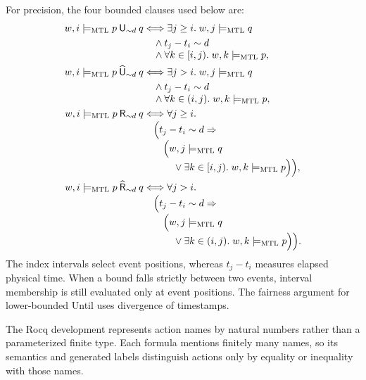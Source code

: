 \documentclass[manuscript]{acmart}
\newcommand{\satM}{\models_{\mathrm{MTL}}}
\newcommand{\Until}{\mathbin{\mathsf{U}}}
\newcommand{\Release}{\mathbin{\mathsf{R}}}
\newcommand{\hUntil}{\mathbin{\widehat{\mathsf{U}}}}
\newcommand{\hRelease}{\mathbin{\widehat{\mathsf{R}}}}
\begin{document}
For precision, the four bounded clauses used below are:
\begin{align*}
 w,i\satM p\Until_{\sim d}q
 &\Longleftrightarrow \exists j\ge i.\; w,j\satM q\\
 &\quad\land t_j-t_i\sim d\\[-1mm]
 &\quad\land \forall k\in[i,j).\;w,k\satM p,\\
 w,i\satM p\hUntil_{\sim d}q
 &\Longleftrightarrow \exists j>i.\; w,j\satM q\\
 &\quad\land t_j-t_i\sim d\\[-1mm]
 &\quad\land \forall k\in(i,j).\;w,k\satM p,\\
 w,i\satM p\Release_{\sim d}q
 &\Longleftrightarrow \forall j\ge i.\\[-1mm]
 &\quad\Bigl(t_j-t_i\sim d\Rightarrow\\[-1mm]
 &\qquad\Bigl(w,j\satM q\\[-1mm]
 &\qquad\quad\lor \exists k\in[i,j).\;w,k\satM p\Bigr)\Bigr),\\
 w,i\satM p\hRelease_{\sim d}q
 &\Longleftrightarrow \forall j>i.\\[-1mm]
 &\quad\Bigl(t_j-t_i\sim d\Rightarrow\\[-1mm]
 &\qquad\Bigl(w,j\satM q\\[-1mm]
 &\qquad\quad\lor \exists k\in(i,j).\;w,k\satM p\Bigr)\Bigr).
\end{align*}
The index intervals select event positions, whereas $t_j-t_i$ measures
elapsed physical time. When a bound falls strictly between two events, interval membership is still
evaluated only at event positions.
The fairness argument for lower-bounded Until uses divergence of timestamps.

The Rocq development represents action names by natural numbers rather than a
parameterized finite type. Each formula mentions finitely many names, so its semantics and generated
labels distinguish actions only by equality or inequality with those names.
\end{document}

